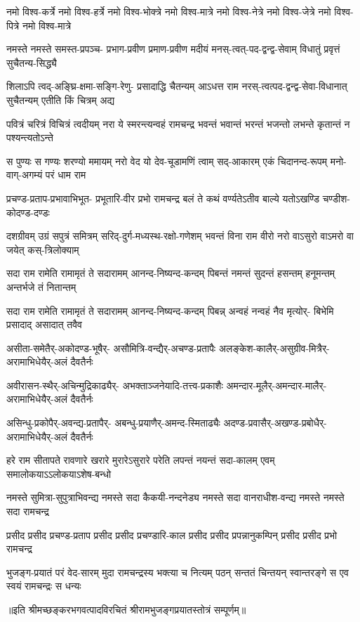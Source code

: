\fourlineindentedshloka
{नमो विश्व-कर्त्रे नमो विश्व-हर्त्रे}
{नमो विश्व-भोक्त्रे नमो विश्व-मात्रे}
{नमो विश्व-नेत्रे नमो विश्व-जेत्रे}
{नमो विश्व-पित्रे नमो विश्व-मात्रे}%

\fourlineindentedshloka
{नमस्ते नमस्ते समस्त-प्रपञ्च-}
{प्रभाग-प्रवीण प्रमाण-प्रवीण}
{मदीयं मनस्-त्वत्-पद-द्वन्द्व-सेवाम्}
{विधातुं प्रवृत्तं सुचैतन्य-सिद्ध्यै}%

\fourlineindentedshloka
{शिलाऽपि त्वद्-अङ्घ्रि-क्षमा-सङ्गि-रेणु-}
{प्रसादाद्धि चैतन्यम् आऽधत्त राम}
{नरस्-त्वत्पद-द्वन्द्व-सेवा-विधानात्}
{सुचैतन्यम् एतीति किं चित्रम् अद्य}%

\fourlineindentedshloka
{पवित्रं चरित्रं विचित्रं त्वदीयम्}
{नरा ये स्मरन्त्यन्वहं रामचन्द्र}
{भवन्तं भवान्तं भरन्तं भजन्तो}
{लभन्ते कृतान्तं न पश्यन्त्यतोऽन्ते}%

\fourlineindentedshloka
{स पुण्यः स गण्यः शरण्यो ममायम्}
{नरो वेद यो देव-चूडामणिं त्वाम्}
{सद्-आकारम् एकं चिदानन्द-रूपम्}
{मनो-वाग्-अगम्यं परं धाम राम}%

\fourlineindentedshloka
{प्रचण्ड-प्रताप-प्रभावाभिभूत-}
{प्रभूतारि-वीर प्रभो रामचन्द्र}
{बलं ते कथं वर्ण्यतेऽतीव बाल्ये}
{यतोऽखण्डि चण्डीश-कोदण्ड-दण्डः}%

\fourlineindentedshloka
{दशग्रीवम् उग्रं सपुत्रं समित्रम्}
{सरिद्-दुर्ग-मध्यस्थ-रक्षो-गणेशम्}
{भवन्तं विना राम वीरो नरो वाऽसुरो}
{वाऽमरो वा जयेत् कस्-त्रिलोक्याम्}%

\fourlineindentedshloka
{सदा राम रामेति रामामृतं ते}
{सदारामम् आनन्द-निष्यन्द-कन्दम्}
{पिबन्तं नमन्तं सुदन्तं हसन्तम्}
{हनूमन्तम् अन्तर्भजे तं नितान्तम्}%

\fourlineindentedshloka
{सदा राम रामेति रामामृतं ते}
{सदारामम् आनन्द-निष्यन्द-कन्दम्}
{पिबन्न् अन्वहं नन्वहं नैव मृत्योर्-}
{बिभेमि प्रसादाद् असादात् तवैव}%

\fourlineindentedshloka
{असीता-समेतैर्-अकोदण्ड-भूषैर्-}
{असौमित्रि-वन्द्यैर्-अचण्ड-प्रतापैः}
{अलङ्केश-कालैर्-असुग्रीव-मित्रैर्-}
{अरामाभिधेयैर्-अलं दैवतैर्नः}%

\fourlineindentedshloka
{अवीरासन-स्थैर्-अचिन्मुद्रिकाढ्यैर्-}
{अभक्ताञ्जनेयादि-तत्त्व-प्रकाशैः}
{अमन्दार-मूलैर्-अमन्दार-मालैर्-}
{अरामाभिधेयैर्-अलं दैवतैर्नः}%

\fourlineindentedshloka
{असिन्धु-प्रकोपैर्-अवन्द्य-प्रतापैर्-}
{अबन्धु-प्रयाणैर्-अमन्द-स्मिताढ्यैः}
{अदण्ड-प्रवासैर्-अखण्ड-प्रबोधैर्-}
{अरामाभिधेयैर्-अलं दैवतैर्नः}%

\fourlineindentedshloka
{हरे राम सीतापते रावणारे}
{खरारे मुरारेऽसुरारे परेति}
{लपन्तं नयन्तं सदा-कालम् एवम्}
{समालोकयाऽऽलोकयाऽशेष-बन्धो}%

\fourlineindentedshloka
{नमस्ते सुमित्रा-सुपुत्राभिवन्द्य}
{नमस्ते सदा कैकयी-नन्दनेड्य}
{नमस्ते सदा वानराधीश-वन्द्य}
{नमस्ते नमस्ते सदा रामचन्द्र}%

\fourlineindentedshloka
{प्रसीद प्रसीद प्रचण्ड-प्रताप}
{प्रसीद प्रसीद प्रचण्डारि-काल}
{प्रसीद प्रसीद प्रपन्नानुकम्पिन्}
{प्रसीद प्रसीद प्रभो रामचन्द्र}%

\fourlineindentedshloka
{भुजङ्ग-प्रयातं परं वेद-सारम्}
{मुदा रामचन्द्रस्य भक्त्या च नित्यम्}
{पठन् सन्ततं चिन्तयन् स्वान्तरङ्गे}
{स एव स्वयं रामचन्द्रः स धन्यः}%

{॥इति श्रीमच्छङ्करभगवत्पादविरचितं श्रीरामभुजङ्गप्रयातस्तोत्रं सम्पूर्णम्॥}

\closesection
